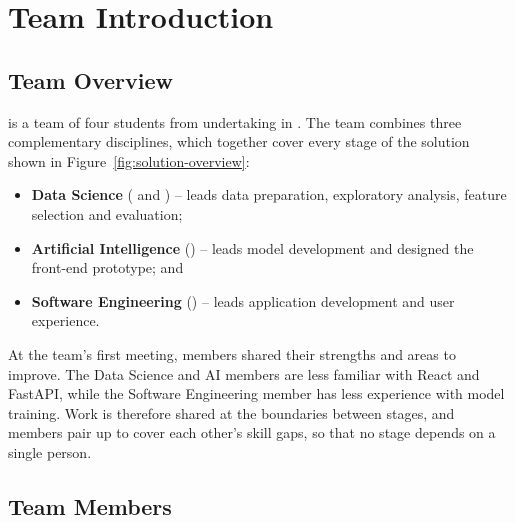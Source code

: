 \section{Team Introduction}\label{sec:team}

\subsection{Team Overview}\label{sec:team-overview}
\teamname{} is a team of four students from \institution{} undertaking \projectname{} in \unitcode{} \unitname. The team combines three complementary disciplines, which together cover every stage of the solution shown in Figure~\ref{fig:solution-overview}:

\begin{itemize}[nosep]
  \item \textbf{Data Science} (\memberOne{} and \memberTwo{}) -- leads data preparation, exploratory analysis, feature selection and evaluation;
  \item \textbf{Artificial Intelligence} (\memberFour{}) -- leads model development and designed the front-end prototype; and
  \item \textbf{Software Engineering} (\memberThree{}) -- leads application development and user experience.
\end{itemize}

At the team's first meeting, members shared their strengths and areas to improve. The Data Science and AI members are less familiar with React and FastAPI, while the Software Engineering member has less experience with model training. Work is therefore shared at the boundaries between stages, and members pair up to cover each other's skill gaps, so that no stage depends on a single person.

\subsection{Team Members}\label{sec:team-members}




